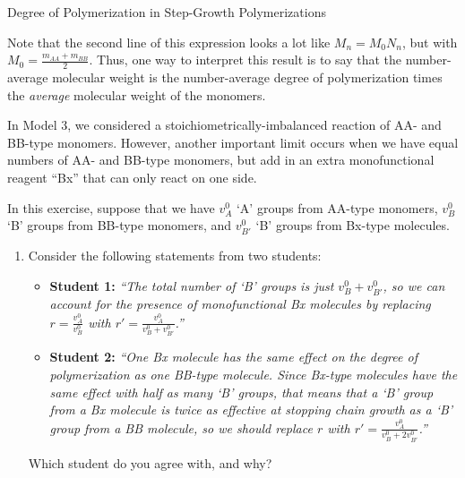 \begin{activity}{Degree of Polymerization in Step-Growth Polymerizations}
\begin{exercises}
\begin{enumerate}
\begin{solution}
{						Note that the second line of this expression looks a lot like $M_n = M_0 N_n$, but with $M_0 = \frac{m_{AA} + m_{BB}}{2}$.  Thus, one way to interpret this result is to say that the number-average molecular weight is the number-average degree of polymerization times the \emph{average} molecular weight of the monomers.
					}\end{solution}
				
			\end{enumerate}
		
		\exercise In Model 3, we considered a stoichiometrically-imbalanced reaction of AA- and BB-type monomers.  However, another important limit occurs when we have equal numbers of AA- and BB-type monomers, but add in an extra monofunctional reagent ``Bx'' that can only react on one side.
		
			In this exercise, suppose that we have $v_A^0$ `A' groups from AA-type monomers, $v_B^0$ `B' groups from BB-type monomers, and $v_{B'}^0$ `B' groups from Bx-type molecules.
		
			\begin{enumerate}
				\item Consider the following statements from two students:
					
					\begin{itemize}
				
					\item \textbf{Student 1:} \emph{``The total number of `B' groups is just $v_B^0 + v_{B'}^0$, so we can account for the presence of monofunctional Bx molecules by replacing $r=\frac{v_A^0}{v_B^0}$ with $r'=\frac{v_A^0}{v_B^0 + v_{B'}^0}$.''}
					
					\item \textbf{Student 2:} \emph{``One Bx molecule has the same effect on the degree of polymerization as one BB-type molecule.  Since Bx-type molecules have the same effect with half as many `B' groups, that means that a `B' group from a Bx molecule is twice as effective at stopping chain growth as a `B' group from a BB molecule, so we should replace $r$ with $r'=\frac{v_A^0}{v_B^0 + 2v_{B'}^0}$.''}
					\end{itemize}
					
					Which student do you agree with, and why?
				
					\begin{solution}
\end{solution}
\end{enumerate}
\end{exercises}
\end{activity}

